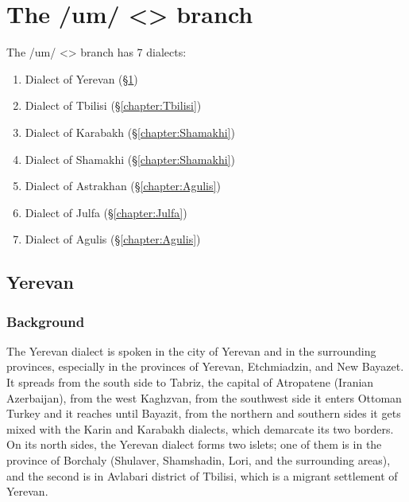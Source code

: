 \part{The /um/ <> branch}

The /um/ <> branch has 7 dialects:

\begin{enumerate}
	\item Dialect of Yerevan (\S\ref{chapter:Yerevan})
	\item Dialect of Tbilisi (\S\ref{chapter:Tbilisi})
	\item Dialect of Karabakh (\S\ref{chapter:Shamakhi})
	\item Dialect of Shamakhi (\S\ref{chapter:Shamakhi})
	\item Dialect of Astrakhan (\S\ref{chapter:Agulis})
	\item Dialect of Julfa (\S\ref{chapter:Julfa})
	\item Dialect of Agulis (\S\ref{chapter:Agulis})
	
\end{enumerate}




\chapter{Yerevan}\label{chapter:Yerevan}



\begin{adjarianpage}\label{page:37}\end{adjarianpage}%

\section{Background}
The Yerevan dialect is spoken in the city of Yerevan and in the surrounding provinces, especially in the provinces of Yerevan, Etchmiadzin, and New Bayazet. It spreads from the south side to Tabriz, the capital of Atropatene (Iranian Azerbaijan), from the west Kaghzvan, from the southwest side it enters Ottoman Turkey and it reaches until Bayazit, from the northern and southern sides it gets mixed with the Karin and Karabakh dialects, which demarcate its two borders. On its north sides, the Yerevan dialect forms two islets; one of them is in the province of Borchaly (Shulaver, Shamshadin, Lori, and the surrounding areas), and the second is in Avlabari district of Tbilisi, which is a migrant settlement of Yerevan. 


